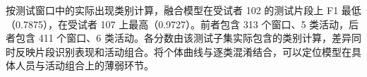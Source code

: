 按测试窗口中的实际出现类别计算，融合模型在受试者 102 的测试片段上 F1 最低（0.7875），在受试者 107 上最高（0.9727）。前者包含 313 个窗口、5 类活动，后者包含 411 个窗口、6 类活动。各分数由该测试子集实际包含的类别计算，差异同时反映片段识别表现和活动组合。将个体曲线与逐类混淆结合，可以定位模型在具体人员与活动组合上的薄弱环节。